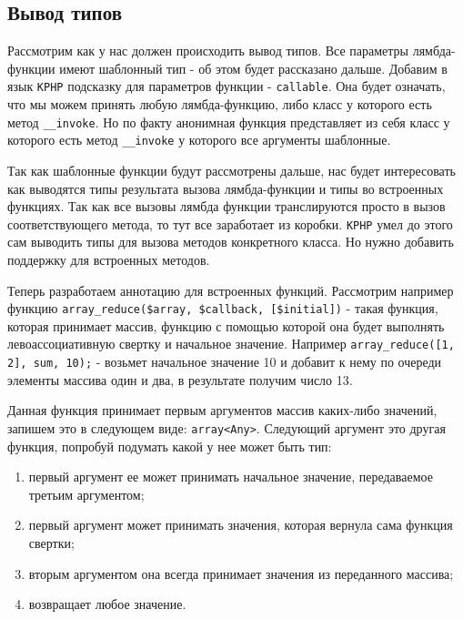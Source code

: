 \subsection{Вывод типов}
Рассмотрим как у нас должен происходить вывод типов.
Все параметры лямбда-функции имеют шаблонный тип - об этом будет рассказано дальше.
Добавим в язык \verb|KPHP| подсказку для параметров функции - \verb|callable|.
Она будет означать, что мы можем принять любую лямбда-функцию, либо класс у которого есть метод \verb|__invoke|.
Но по факту анонимная функция представляет из себя класс у которого есть метод \verb|__invoke| у которого все аргументы шаблонные.

Так как шаблонные функции будут рассмотрены дальше, нас будет интересовать как выводятся типы результата вызова лямбда-функции и типы во встроенных функциях.
Так как все вызовы лямбда функции транслируются просто в вызов соответствующего метода, то тут все заработает из коробки.
\verb|KPHP| умел до этого сам выводить типы для вызова методов конкретного класса.
Но нужно добавить поддержку для встроенных методов.

Теперь разработаем аннотацию для встроенных функций.
Рассмотрим например функцию \verb|array_reduce($array, $callback, [$initial])| - такая функция, которая принимает массив, функцию с помощью которой она будет выполнять левоассоциативную свертку \cite{foldl} и начальное значение.
Например \verb|array_reduce([1, 2], sum, 10);| - возьмет начальное значение 10 и добавит к нему по очереди элементы массива один и два, в результате получим число 13.

Данная функция принимает первым аргументов массив каких-либо значений, запишем это в следующем виде: \verb|array<Any>|.
Следующий аргумент это другая функция, попробуй подумать какой у нее может быть тип:
\begin{enumerate}
  \item первый аргумент ее может принимать начальное значение, передаваемое третьим аргументом;
  \item первый аргумент может принимать значения, которая вернула сама функция свертки;
  \item вторым аргументом она всегда принимает значения из переданного массива;
  \item возвращает любое значение.
\end{enumerate}

